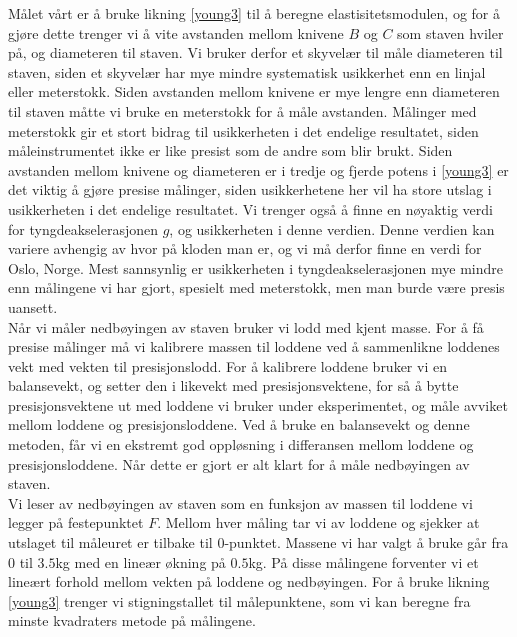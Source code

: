 \documentclass[%
 reprint,
 amsmath,amssymb,
 aps,
 norsk,
 booktabs
]{revtex4-1}
\begin{document}
Målet vårt er å bruke likning \eqref{young3} til å beregne elastisitetsmodulen, og for å gjøre dette trenger vi å vite avstanden mellom knivene $B$ og $C$ som staven hviler på, og diameteren til staven. Vi bruker derfor et skyvelær til måle diameteren til staven, siden et skyvelær har mye mindre systematisk usikkerhet enn en linjal eller meterstokk. Siden avstanden mellom knivene er mye lengre enn diameteren til staven måtte vi bruke en meterstokk for å måle avstanden. Målinger med meterstokk gir et stort bidrag til usikkerheten i det endelige resultatet, siden måleinstrumentet ikke er like presist som de andre som blir brukt. Siden avstanden mellom knivene og diameteren er i tredje og fjerde potens i \eqref{young3} er det viktig å gjøre presise målinger, siden usikkerhetene her vil ha store utslag i usikkerheten i det endelige resultatet. Vi trenger også å finne en nøyaktig verdi for tyngdeakselerasjonen $g$, og usikkerheten i denne verdien. Denne verdien kan variere avhengig av hvor på kloden man er, og vi må derfor finne en verdi for Oslo, Norge. Mest sannsynlig er usikkerheten i tyngdeakselerasjonen mye mindre enn målingene vi har gjort, spesielt med meterstokk, men man burde være  presis uansett.\\
Når vi måler nedbøyingen av staven bruker vi lodd med kjent masse. For å få presise målinger må vi kalibrere massen til loddene ved å sammenlikne loddenes vekt med vekten til presisjonslodd. For å kalibrere loddene bruker vi en balansevekt, og setter den i likevekt med presisjonsvektene, for så å bytte presisjonsvektene ut med loddene vi bruker under eksperimentet, og måle avviket mellom loddene og presisjonsloddene. Ved å bruke en balansevekt og denne metoden, får vi en ekstremt god oppløsning i differansen mellom loddene og presisjonsloddene. Når dette er gjort er alt klart for å måle nedbøyingen av staven.\\
Vi leser av nedbøyingen av staven som en funksjon av massen til loddene vi legger på festepunktet $F$. Mellom hver måling tar vi av loddene og sjekker at utslaget til måleuret er tilbake til $0$-punktet. Massene vi har valgt å bruke går fra $0$ til $3.5$kg med en lineær økning på $0.5$kg. På disse målingene forventer vi et lineært forhold mellom vekten på loddene og nedbøyingen. For å bruke likning \eqref{young3} trenger vi stigningstallet til målepunktene, som vi kan beregne fra minste kvadraters metode på målingene. \\
\end{document}
